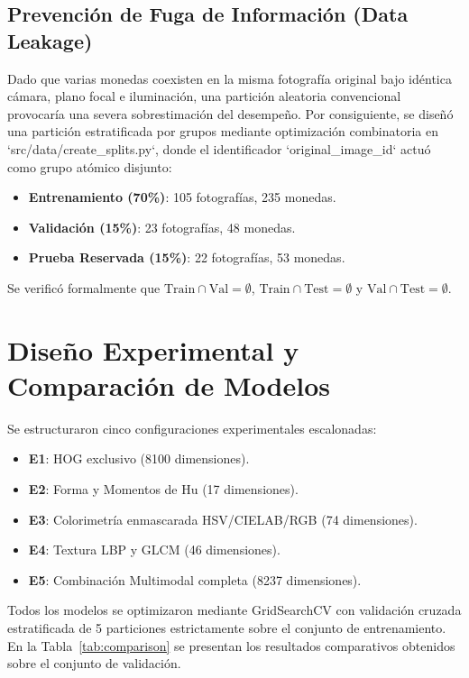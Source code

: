 \documentclass[journal,compsoc,twoside]{IEEEtran}
\begin{document}
\subsection{Prevención de Fuga de Información (Data Leakage)}
Dado que varias monedas coexisten en la misma fotografía original bajo idéntica cámara, plano focal e iluminación, una partición aleatoria convencional provocaría una severa sobrestimación del desempeño. Por consiguiente, se diseñó una partición estratificada por grupos mediante optimización combinatoria en `src/data/create_splits.py`, donde el identificador `original_image_id` actuó como grupo atómico disjunto:
\begin{itemize}
    \item \textbf{Entrenamiento (70\%)}: 105 fotografías, 235 monedas.
    \item \textbf{Validación (15\%)}: 23 fotografías, 48 monedas.
    \item \textbf{Prueba Reservada (15\%)}: 22 fotografías, 53 monedas.
\end{itemize}
Se verificó formalmente que $\text{Train} \cap \text{Val} = \emptyset$, $\text{Train} \cap \text{Test} = \emptyset$ y $\text{Val} \cap \text{Test} = \emptyset$.

\section{Diseño Experimental y Comparación de Modelos}

Se estructuraron cinco configuraciones experimentales escalonadas:
\begin{itemize}
    \item \textbf{E1}: HOG exclusivo (8100 dimensiones).
    \item \textbf{E2}: Forma y Momentos de Hu (17 dimensiones).
    \item \textbf{E3}: Colorimetría enmascarada HSV/CIELAB/RGB (74 dimensiones).
    \item \textbf{E4}: Textura LBP y GLCM (46 dimensiones).
    \item \textbf{E5}: Combinación Multimodal completa (8237 dimensiones).
\end{itemize}

Todos los modelos se optimizaron mediante GridSearchCV con validación cruzada estratificada de 5 particiones estrictamente sobre el conjunto de entrenamiento. En la Tabla~\ref{tab:comparison} se presentan los resultados comparativos obtenidos sobre el conjunto de validación.
\end{document}

